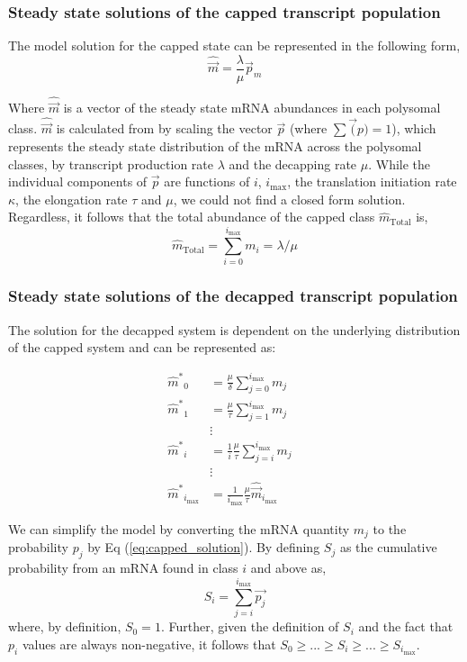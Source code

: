 \documentclass[10pt,letterpaper]{article}
\newcommand{\imax}{\ensuremath{{i_{\max}}}\xspace}
\newcommand{\mhat}{\ensuremath{\hat{m}}\xspace}
\newcommand{\mhatstar}{\ensuremath{\mhat^{*}}\xspace}
\newcommand{\mvec}{\ensuremath{\vec{m}}\xspace}
\newcommand{\mvechat}{\ensuremath{\hat{\mvec}}\xspace}
\newcommand{\msum}{\ensuremath{\hat{m}_{\text{Total}}}\xspace}
\begin{document}
\subsubsection*{Steady state solutions of the capped transcript population}
The model solution for the capped state can be represented in the following form,
\begin{equation} \label{eq:capped_solution}
  \mvechat=\frac{\lambda}{\mu}\vec{p}_m
\end{equation}

Where \mvechat is a vector of the steady state mRNA abundances in each polysomal class.
\mvechat is calculated from by scaling  the vector $\vec{p}$ (where $\sum \vec(p) = 1$), which represents the steady state distribution of the mRNA across the polysomal classes, by transcript production rate $\lambda$ and the decapping rate $\mu$.
While the individual components of $\vec{p}$ are functions of $i$, \imax, the translation initiation rate $\kappa$, the elongation rate $\tau$ and $\mu$, we could not find a closed form solution.
Regardless, it follows that the total abundance of the capped class \msum is,
\begin{equation}\label{eq:capped_sum}
  \msum = \sum_{i = 0} ^\imax m_i = \lambda/\mu
\end{equation}

\subsubsection*{Steady state solutions of the decapped transcript population}

The solution for the decapped system is dependent on the underlying distribution of the capped system and can be represented as:

\begin{align} 
  \label{eq:decapped_abundance}
  \mhatstar_0  &= \frac{\mu}{\delta}\sum_{j=0}^{\imax}m_{j} \nonumber \\
  \mhatstar_1  &= \frac{\mu}{\tau}\sum_{j=1}^{\imax}m_{j}  \nonumber \\
               & \vdots &  \\
  \mhatstar_i  &= \frac{1}{i}\frac{\mu}{\tau}\sum_{j=i}^{\imax}m_{j}  \nonumber \\
               & \vdots & \nonumber \\
  \mhatstar_{\imax}  &= \frac{1}{\imax}\frac{\mu}{\tau} \mvechat_{\imax}   \nonumber
\end{align}

We can simplify the model by converting the mRNA quantity $m_{j}$ to the probability $p_{j}$ by Eq (\ref{eq:capped_solution}).
By defining $S_{j}$ as the cumulative probability from an mRNA found in class $i$ and above as,
\begin{equation}
  \label{eq:S}
  S_{i} = \sum_{j = i}^{\imax}\vec{p_{j}}
\end{equation}
where, by definition, $S_{0} = 1.$
Further, given the definition of $S_{i}$ and the fact that $p_{i}$ values are always non-negative, it follows that $S_{0} \ge ... \ge S_{i} \ge ... \ge S_{\imax}$.
\end{document}
